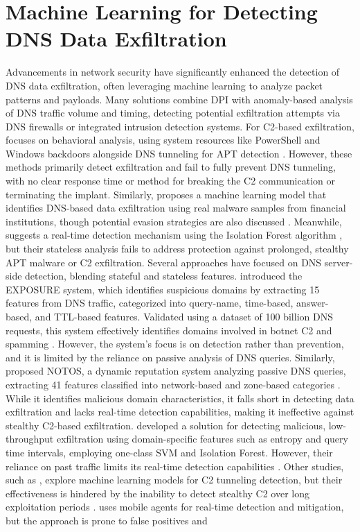 \documentclass [11pt, proquest] {uwthesis}[2020/02/24]
\begin{document}
\section{Machine Learning for Detecting DNS Data Exfiltration}
Advancements in network security have significantly enhanced the detection of DNS data exfiltration, often leveraging machine learning to analyze packet patterns and payloads. Many solutions combine DPI with anomaly-based analysis of DNS traffic volume and timing, detecting potential exfiltration attempts via DNS firewalls or integrated intrusion detection systems. For C2-based exfiltration, \citeauthor{apt-process} focuses on behavioral analysis, using system resources like PowerShell and Windows backdoors alongside DNS tunneling for APT detection \cite{apt-process}. However, these methods primarily detect exfiltration and fail to fully prevent DNS tunneling, with no clear response time or method for breaking the C2 communication or terminating the implant. Similarly, \citeauthor{Das} proposes a machine learning model that identifies DNS-based data exfiltration using real malware samples from financial institutions, though potential evasion strategies are also discussed \cite{Das}. Meanwhile, \citeauthor{8717806d} suggests a real-time detection mechanism using the Isolation Forest algorithm \cite{8717806d}, but their stateless analysis fails to address protection against prolonged, stealthy APT malware or C2 exfiltration. Several approaches have focused on DNS server-side detection, blending stateful and stateless features. \citeauthor{bilge2011exposure} introduced the EXPOSURE system, which identifies suspicious domains by extracting 15 features from DNS traffic, categorized into query-name, time-based, answer-based, and TTL-based features. Validated using a dataset of 100 billion DNS requests, this system effectively identifies domains involved in botnet C2 and spamming \cite{bilge2011exposure}. However, the system’s focus is on detection rather than prevention, and it is limited by the reliance on passive analysis of DNS queries. Similarly, \citeauthor{antonakakis2010building} proposed NOTOS, a dynamic reputation system analyzing passive DNS queries, extracting 41 features classified into network-based and zone-based categories \cite{antonakakis2010building}. While it identifies malicious domain characteristics, it falls short in detecting data exfiltration and lacks real-time detection capabilities, making it ineffective against stealthy C2-based exfiltration. \citeauthor{DBLP:journals/corr/abs-1709-08395} developed a solution for detecting malicious, low-throughput exfiltration using domain-specific features such as entropy and query time intervals, employing one-class SVM and Isolation Forest. However, their reliance on past traffic limits its real-time detection capabilities \cite{DBLP:journals/corr/abs-1709-08395}. Other studies, such as \citeauthor{10.1145/3230833.3233278}, explore machine learning models for C2 tunneling detection, but their effectiveness is hindered by the inability to detect stealthy C2 over long exploitation periods \cite{10.1145/3230833.3233278}. \citeauthor{9486400} uses mobile agents for real-time detection and mitigation, but the approach is prone to false positives and 
\end{document}
